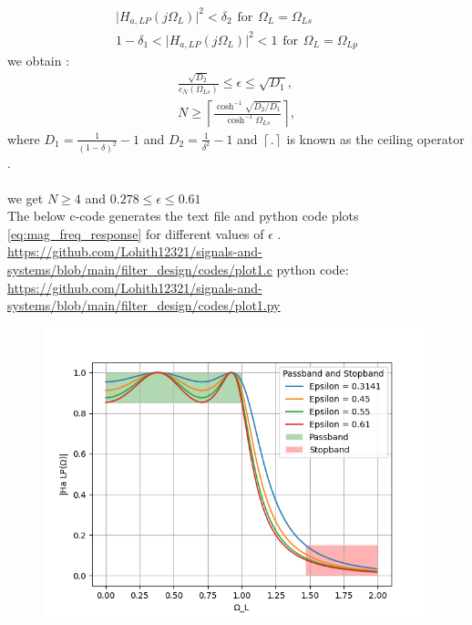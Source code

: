 \documentclass{article}
\begin{document}
\begin{itemize}
\begin{align}
    \vert H_{a,LP}(j\Omega_L)\vert^2 < \delta_{2} \hspace{5pt} \text{for}\hspace{5pt} \Omega_L = \Omega_{Ls}\\
    1-\delta_{1}<\vert H_{a,LP}(j\Omega_L)\vert^2 < 1 \hspace{5pt} \text{for}\hspace{5pt} \Omega_L = \Omega_{Lp}
\end{align}
we obtain :
\begin{eqnarray}
\label{lpdesign}
\frac{\sqrt{D_2}}{c_N(\Omega_{Ls})} \leq \epsilon \leq \sqrt{D_1}, \nonumber \\
N \geq \left\lceil \frac{\cosh^{-1}\sqrt{D_2/D_1}}{\cosh^{-1}\Omega_{Ls}} \right\rceil,
\end{eqnarray}
where $D_1 = \frac{1}{(1 - \delta)^2}-1$ and $D_2 = \frac{1}{\delta^2} - 1$ and $\left \lceil . \right \rceil$ is known as the ceiling operator . \\
\\

we get $N\geq 4$ and $0.278 \leq \epsilon \leq 0.61$\\
The below c-code generates the text file and python code plots \eqref{eq:mag_freq_response} for different values of $\epsilon$ .\\
\href{https://github.com/Lohith12321/signals-and-systems/blob/main/filter_design/codes/plot1.c}{https://github.com/Lohith12321/signals-and-systems/blob/main/filter_design/codes/plot1.c}
python code:\\
\href{https://github.com/Lohith12321/signals-and-systems/blob/main/filter_design/codes/plot1.py}{https://github.com/Lohith12321/signals-and-systems/blob/main/filter_design/codes/plot1.py}
\begin{figure}[H]
\centering
\includegraphics[width=1\columnwidth]{figs/plot1.png}

\end{figure}
\end{itemize}
\end{document}

